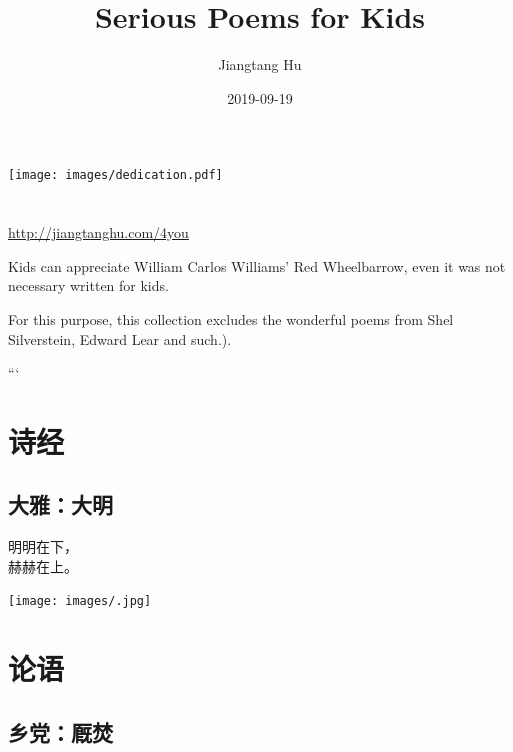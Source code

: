\documentclass[
]{book}
\title{Serious Poems for Kids}
\author{Jiangtang Hu}
\date{2019-09-19}
\renewenvironment{quote}{\begin{VF}}{\end{VF}}
\begin{document}
\frontmatter
\maketitle

\thispagestyle{empty}
\begin{center}
\texttt{[image: images/dedication.pdf]}
\end{center}

\setlength{\abovedisplayskip}{-5pt}
\setlength{\abovedisplayshortskip}{-5pt}

{
\setcounter{tocdepth}{2}
\tableofcontents
}
\mainmatter
\hypertarget{section}{%
\chapter*{}\label{section}}

\url{http://jiangtanghu.com/4you}

Kids can appreciate William Carlos Williams' Red Wheelbarrow, even it was not necessary written for kids.

For this purpose, this collection excludes the wonderful poems from Shel Silverstein, Edward Lear and such.).

```

\hypertarget{section-1}{%
\chapter{诗经}\label{section-1}}

\hypertarget{section-2}{%
\section{大雅：大明}\label{section-2}}

\begin{quote}
明明在下，\\
赫赫在上。
\end{quote}

\texttt{[image: images/.jpg]}

\hypertarget{section-3}{%
\chapter{论语}\label{section-3}}

\hypertarget{section-4}{%
\section{乡党：厩焚}\label{section-4}}
\end{document}
